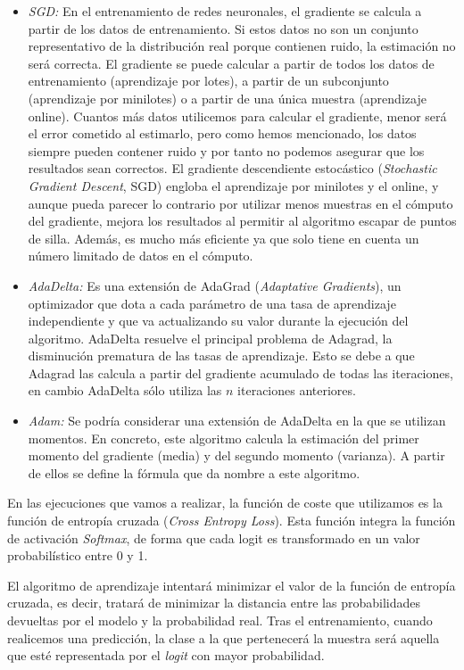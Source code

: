 \begin{itemize}
    \begin{itemize}
        \item \textit{SGD:} En el entrenamiento de redes neuronales, el gradiente se calcula a partir de los datos de entrenamiento. Si estos datos no son un conjunto representativo de la distribución real porque contienen ruido, la estimación no será correcta. El gradiente se puede calcular a partir de todos los datos de entrenamiento (aprendizaje por lotes), a partir de un subconjunto (aprendizaje por minilotes) o a partir de una única muestra (aprendizaje online). Cuantos más datos utilicemos para calcular el gradiente, menor será el error cometido al estimarlo, pero como hemos mencionado, los datos siempre pueden contener ruido y por tanto no podemos asegurar que los resultados sean correctos. El gradiente descendiente estocástico (\textit{Stochastic Gradient Descent}, SGD) engloba el aprendizaje por minilotes y el online, y aunque pueda parecer lo contrario por utilizar menos muestras en el cómputo del gradiente, mejora los resultados al permitir al algoritmo escapar de puntos de silla. Además, es mucho más eficiente ya que solo tiene en cuenta un número limitado de datos en el cómputo.
        \item \textit{AdaDelta:} Es una extensión de AdaGrad (\textit{Adaptative Gradients}), un optimizador que dota a cada parámetro de una tasa de aprendizaje independiente y que va actualizando su valor durante la ejecución del algoritmo. AdaDelta resuelve el principal problema de Adagrad, la disminución prematura de las tasas de aprendizaje. Esto se debe a que Adagrad las calcula a partir del gradiente acumulado de todas las iteraciones, en cambio AdaDelta sólo utiliza las $n$ iteraciones anteriores.
        \item \textit{Adam:} Se podría considerar una extensión de AdaDelta en la que se utilizan momentos. En concreto, este algoritmo calcula la estimación del primer momento del gradiente (media) y del segundo momento (varianza). A partir de ellos se define la fórmula que da nombre a este algoritmo.
    \end{itemize}
\end{itemize}

En las ejecuciones que vamos a realizar, la función de coste que utilizamos es la función de entropía cruzada (\textit{Cross Entropy Loss}). Esta función integra la función de activación \textit{Softmax}, de forma que cada logit es transformado en un valor probabilístico entre 0 y 1. 

El algoritmo de aprendizaje intentará minimizar el valor de la función de entropía cruzada, es decir, tratará de minimizar la distancia entre las probabilidades devueltas por el modelo y la probabilidad real. Tras el entrenamiento, cuando realicemos una predicción, la clase a la que pertenecerá la muestra será aquella que esté representada por el \textit{logit} con mayor probabilidad. \cite{crossentropyloss}



